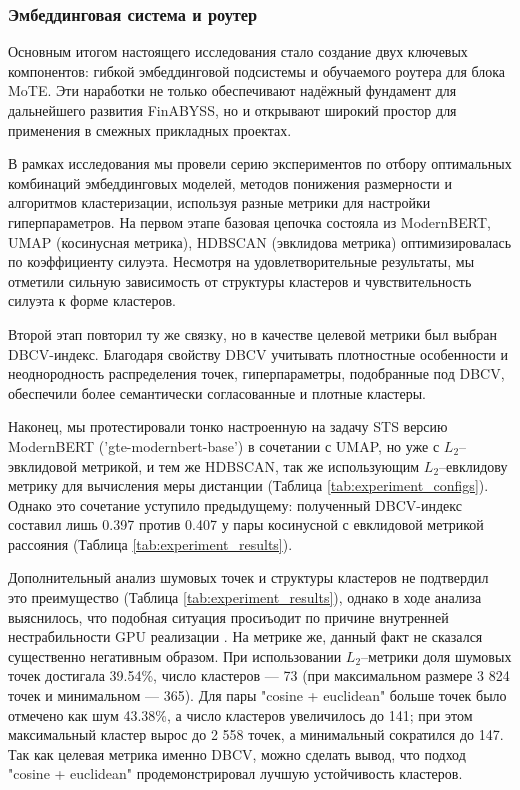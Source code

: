\subsubsection{Эмбеддинговая система и роутер}
\label{sec:emb_sys_and_router}

Основным итогом настоящего исследования стало создание двух ключевых компонентов: гибкой эмбеддинговой подсистемы
и обучаемого роутера для блока MoTE. Эти наработки не только обеспечивают надёжный фундамент для дальнейшего
развития FinABYSS, но и открывают широкий простор для применения в смежных прикладных проектах.

В рамках исследования мы провели серию экспериментов по отбору оптимальных комбинаций эмбеддинговых моделей,
методов понижения размерности и алгоритмов кластеризации, используя разные метрики для настройки гиперпараметров.
На первом этапе базовая цепочка состояла из ModernBERT, UMAP (косинусная метрика), HDBSCAN (эвклидова метрика)
оптимизировалась по коэффициенту силуэта. Несмотря на удовлетворительные результаты, мы отметили сильную
зависимость от структуры кластеров и чувствительность силуэта к форме кластеров.

Второй этап повторил ту же связку, но в качестве целевой метрики был выбран DBCV-индекс. Благодаря свойству
DBCV учитывать плотностные особенности и неоднородность распределения точек, гиперпараметры, подобранные
под DBCV, обеспечили более семантически согласованные и плотные кластеры.

Наконец, мы протестировали тонко настроенную на задачу STS версию ModernBERT ('gte-modernbert-base') \parencite{Warner2024ModernBERT, MGTE2024} в сочетании с UMAP,
но уже с $L_2$–эвклидовой метрикой, и тем же HDBSCAN, так же использующим $L_2$–евклидову метрику для вычисления меры дистанции (Таблица \ref{tab:experiment_configs}).
Однако это сочетание уступило предыдущему: полученный DBCV-индекс составил лишь 0.397 против 0.407 у пары косинусной с евклидовой метрикой рассояния (Таблица \ref{tab:experiment_results}).



Дополнительный анализ шумовых точек и структуры кластеров не подтвердил это преимущество (Таблица \ref{tab:experiment_results}),
однако в ходе анализа выяснилось, что подобная ситуация просиъодит по причине внутренней нестрабильности GPU реализации \parencite{cuml2020machine}. На метрике же,
данный факт не сказался существенно негативным образом. При использовании $L_2$–метрики
доля шумовых точек достигала 39.54\%, число кластеров --- 73 (при максимальном размере 3 824 точек и минимальном --- 365).
Для пары "cosine + euclidean" больше точек было отмечено как шум 43.38\%, а число кластеров увеличилось до 141; при этом максимальный
кластер вырос до 2 558 точек, а минимальный сократился до 147. Так как целевая метрика именно DBCV, можно сделать вывод, что
подход "cosine + euclidean" продемонстрировал лучшую устойчивость кластеров.

